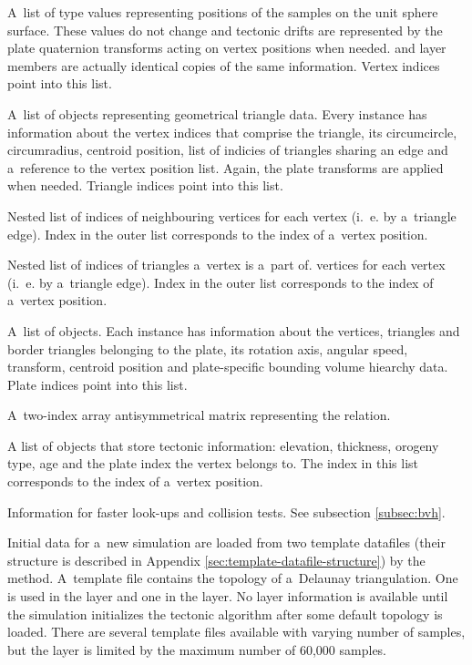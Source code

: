 \begin{itemize}[\label={}]
\item[\textbf{Vertex positions}] A~list of  type values representing positions of the samples on the unit sphere surface. These values do not change and tectonic drifts are represented by the plate quaternion transforms acting on vertex positions when needed.  and  layer members are actually identical copies of the same information. Vertex indices point into this list.
\item[\textbf{Triangles}] A~list of  objects representing geometrical triangle data. Every instance has information about the vertex indices that comprise the triangle, its circumcircle, circumradius, centroid position, list of indicies of triangles sharing an edge and a~reference to the vertex position list. Again, the plate transforms are applied when needed. Triangle indices point into this list.
\item[\textbf{Vertex neighbours}] Nested  list of indices of neighbouring vertices for each vertex (i.~e. by a~triangle edge). Index in the outer list corresponds to the index of a~vertex position.
\item[\textbf{Triangles of vertices}] Nested  list of indices of triangles a~vertex is a~part of. vertices for each vertex (i.~e. by a~triangle edge). Index in the outer list corresponds to the index of a~vertex position.
\item[\textbf{Tectonic plates}] A~list of  objects. Each instance has information about the vertices, triangles and border triangles belonging to the plate, its rotation axis, angular speed, transform, centroid position and plate-specific bounding volume hiearchy data. Plate indices point into this list.
\item[\textbf{Overlap relations}] A~two-index array antisymmetrical matrix representing the relation.
\item[\textbf{Surface point data}] A list of  objects that store tectonic information: elevation, thickness, orogeny type, age and the plate index the vertex belongs to. The index in this list corresponds to the index of a~vertex position.
\item[\textbf{Bounding volume hiearchy}] Information for faster look-ups and collision tests. See subsection \ref{subsec:bvh}.
\end{itemize}

Initial data for a~new simulation are loaded from two template datafiles (their structure is described in Appendix \ref{sec:template-datafile-structure}) by the  method. A~template file contains the topology of a~Delaunay triangulation. One is used in the  layer and one in the  layer. No  layer information is available until the simulation initializes the tectonic algorithm after some default topology is loaded.  There are several template files available with varying number of samples, but the  layer is limited by the maximum number of 60,000 samples.
